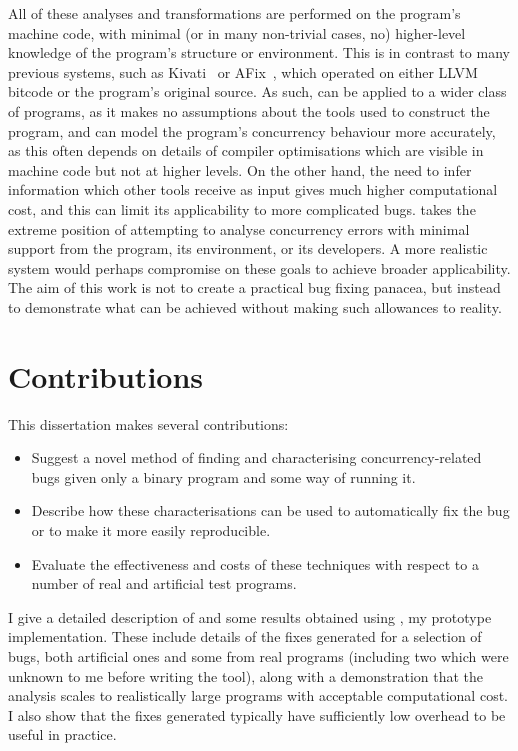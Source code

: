 All of these analyses and transformations are performed on the
program's machine code, with minimal (or in many non-trivial cases,
no) higher-level knowledge of the program's structure or environment.
This is in contrast to many previous systems, such as
Kivati~\cite{Chew2010} or AFix~\cite{Jin2011}, which operated on
either LLVM bitcode or the program's original source.  As such,
{\technique} can be applied to a wider class of programs, as it makes
no assumptions about the tools used to construct the program, and can
model the program's concurrency behaviour more accurately, as this
often depends on details of compiler optimisations which are visible
in machine code but not at higher levels.  On the other hand, the need
to infer information which other tools receive as input gives
{\technique} much higher computational cost, and this can limit its
applicability to more complicated bugs.  {\Technique} takes the
extreme position of attempting to analyse concurrency errors with
minimal support from the program, its environment, or its developers.
A more realistic system would perhaps compromise on these goals to
achieve broader applicability.  The aim of this work is not to create
a practical bug fixing panacea, but instead to demonstrate what can be
achieved without making such allowances to reality.

\section{Contributions}

This dissertation makes several contributions:
\begin{itemize}
\item
  Suggest a novel method of finding and characterising
  concurrency-related bugs given only a binary program and some way of
  running it.
\item
  Describe how these characterisations can be used to automatically
  fix the bug or to make it more easily reproducible.
\item
  Evaluate the effectiveness and costs of these techniques with
  respect to a number of real and artificial test programs.
\end{itemize}
I give a detailed description of {\technique} and some results
obtained using \implementation, my prototype implementation.  These
include details of the fixes generated for a selection of bugs, both
artificial ones and some from real programs (including two which were
unknown to me before writing the tool), along with a demonstration
that the analysis scales to realistically large programs with
acceptable computational cost.  I also show that the fixes generated
typically have sufficiently low overhead to be useful in practice.

